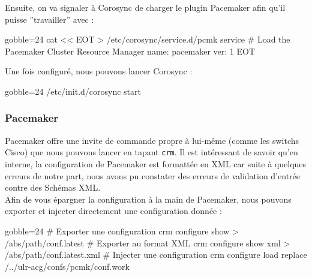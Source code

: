 \documentclass[11pt,a4paper]{report}
\begin{document}
                    Ensuite, on va signaler \`a Corosync de charger le plugin Pacemaker afin qu'il puisse ''travailler'' avec :\\
                    
                    \begin{bashcode*}{gobble=24}
                        cat << EOT > /etc/corosync/service.d/pcmk
                        service {
                                # Load the Pacemaker Cluster Resource Manager
                                name: pacemaker
                                ver:  1
                        }
                        EOT
                    \end{bashcode*}
                    
                    Une fois configur\'e, nous pouvons lancer Corosync :\\
                    
                    \begin{bashcode*}{gobble=24}
                        /etc/init.d/corosync start
                    \end{bashcode*}
                    
                \subsubsection{Pacemaker}
                    
                    Pacemaker offre une invite de commande propre \`a lui-m\^eme (comme les switchs Cisco) que nous pouvons lancer en tapant \verb+crm+. Il est int\'eressant de savoir qu'en interne, la configuration de Pacemaker est formatt\'ee en XML car suite \`a quelques erreurs de notre part, nous avons pu constater des erreurs de validation d'entr\'ee contre des Sch\'emas XML.\\
                    
                    Afin de vous \'epargner la configuration \`a la main de Pacemaker, nous pouvons exporter et injecter directement une configuration donn\'ee :\\
                    
                    \begin{bashcode*}{gobble=24}
                        # Exporter une configuration
                        crm configure show > /abs/path/conf.latest
                        # Exporter au format XML
                        crm configure show xml > /abs/path/conf.latest.xml
                        # Injecter une configuration
                        crm configure load replace /../ulr-acg/confs/pcmk/conf.work
                    \end{bashcode*}
                    
\end{document}
